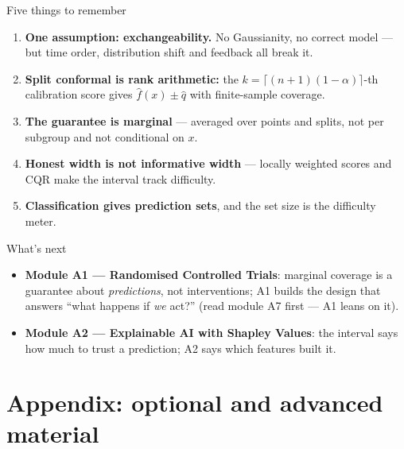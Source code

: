 \documentclass[aspectratio=169,11pt]{beamer}
\begin{document}
\begin{frame}{Five things to remember}
  \begin{takeaway}
    \begin{enumerate}
      \item \textbf{One assumption: exchangeability.} No Gaussianity, no correct model ---
            but time order, distribution shift and feedback all break it.
      \item \textbf{Split conformal is rank arithmetic:} the
            $k = \lceil (n+1)(1-\alpha) \rceil$-th calibration score gives
            $\hat f(x) \pm \hat q$ with finite-sample coverage.
      \item \textbf{The guarantee is marginal} --- averaged over points and splits, not
            per subgroup and not conditional on $x$.
      \item \textbf{Honest width is not informative width} --- locally weighted scores and
            CQR make the interval track difficulty.
      \item \textbf{Classification gives prediction sets}, and the set size is the
            difficulty meter.
    \end{enumerate}
  \end{takeaway}
\end{frame}

\begin{frame}{What's next}
  \begin{itemize}
    \item \textbf{Module A1 --- Randomised Controlled Trials}: marginal coverage
          is a guarantee about \emph{predictions}, not interventions; A1 builds
          the design that answers ``what happens if \emph{we} act?''
          (read module A7 first --- A1 leans on it).
    \item \textbf{Module A2 --- Explainable AI with Shapley Values}: the interval
          says how much to trust a prediction; A2 says which features built it.
  \end{itemize}
\end{frame}


\appendix
\AtBeginSection[]{}
\section{Appendix: optional and advanced material}
\end{document}
